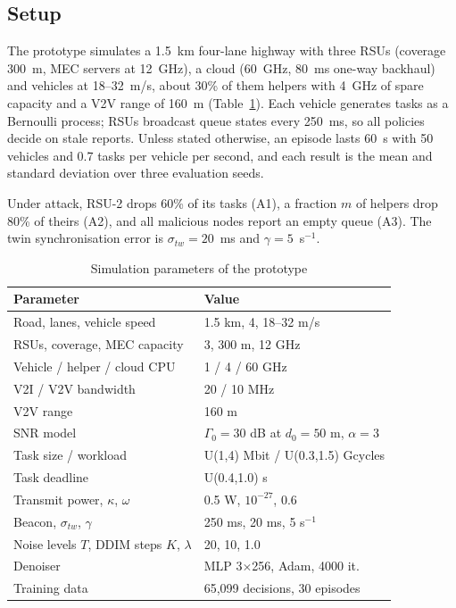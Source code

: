 \subsection{Setup}
The prototype simulates a 1.5~km four-lane highway with three RSUs (coverage 300~m, MEC servers at 12~GHz), a cloud (60~GHz, 80~ms one-way backhaul) and vehicles at 18--32~m/s, about 30\% of them helpers with 4~GHz of spare capacity and a V2V range of 160~m (Table~\ref{tab:params}). Each vehicle generates tasks as a Bernoulli process; RSUs broadcast queue states every 250~ms, so all policies decide on stale reports. Unless stated otherwise, an episode lasts 60~s with 50 vehicles and 0.7 tasks per vehicle per second, and each result is the mean and standard deviation over three evaluation seeds.

Under attack, RSU-2 drops 60\% of its tasks (A1), a fraction $m$ of helpers drop 80\% of theirs (A2), and all malicious nodes report an empty queue (A3). The twin synchronisation error is $\sigma_{tw}=20$~ms and $\gamma=5$~s$^{-1}$.

\begin{table}[t]
\caption{Simulation parameters of the prototype}\label{tab:params}
\centering\footnotesize
\begin{tabular}{@{}ll@{}}
\toprule
Parameter & Value \\ \midrule
Road, lanes, vehicle speed & 1.5 km, 4, 18--32 m/s \\
RSUs, coverage, MEC capacity & 3, 300 m, 12 GHz \\
Vehicle / helper / cloud CPU & 1 / 4 / 60 GHz \\
V2I / V2V bandwidth & 20 / 10 MHz \\
V2V range & 160 m \\
SNR model & $\Gamma_0=30$ dB at $d_0=50$ m, $\alpha=3$ \\
Task size / workload & U(1,4) Mbit / U(0.3,1.5) Gcycles \\
Task deadline & U(0.4,1.0) s \\
Transmit power, $\kappa$, $\omega$ & 0.5 W, $10^{-27}$, 0.6 \\
Beacon, $\sigma_{tw}$, $\gamma$ & 250 ms, 20 ms, 5 s$^{-1}$ \\
Noise levels $T$, DDIM steps $K$, $\lambda$ & 20, 10, 1.0 \\
Denoiser & MLP 3$\times$256, Adam, 4000 it. \\
Training data & 65{,}099 decisions, 30 episodes \\
\bottomrule
\end{tabular}
\end{table}

